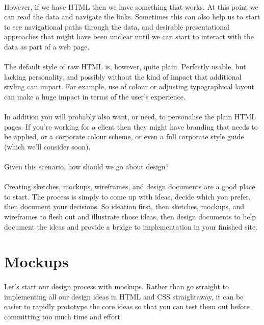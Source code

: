 \paragraph{} However, if we have HTML then we have something that works. At this point we can read the data and navigate the links. Sometimes this can also help us to start to see navigational paths through the data, and desirable presentational approaches that might have been unclear until we can start to interact with the data as part of a web page.
\paragraph{} The default style of raw HTML is, however, quite plain. Perfectly usable, but lacking personality, and possibly without the kind of impact that additional styling can impart. For example, use of colour or adjusting typographical layout can make a huge impact in terms of the user’s experience.
\paragraph{} In addition you will probably also want, or need, to personalise the plain HTML pages. If you're working for a client then they might have branding that needs to be applied, or a corporate colour scheme, or even a full corporate style guide (which we'll consider soon).
\paragraph{} Given this scenario, how should we go about design? 
\paragraph{} Creating sketches, mockups, wireframes, and design documents are a good place to start. The process is simply to come up with ideas, decide which you prefer, then document your decisions. So ideation first, then sketches, mockups, and wireframes to flesh out and illustrate those ideas, then design documents to help document the ideas and provide a bridge to implementation in your finished site.



\section{Mockups}
\paragraph{} Let's start our design process with mockups. Rather than go straight to implementing all our design ideas in HTML and CSS straightaway, it can be easier to rapidly prototype the core ideas so that you can test them out before committing too much time and effort. 
